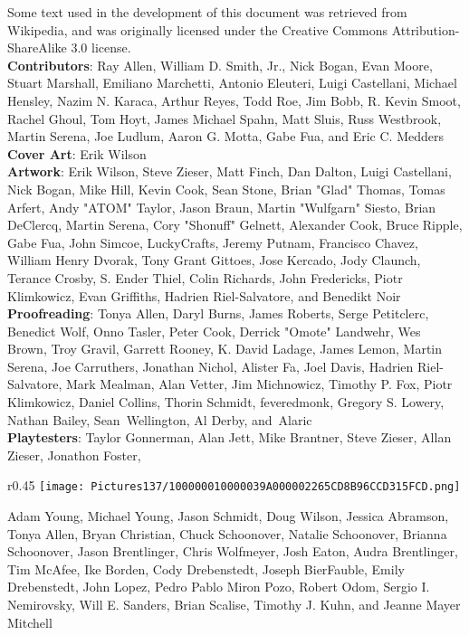 \documentclass[a4paper,twoside,openany,10pt]{book}
\begin{document}
Some text used in the development of this document was retrieved from Wikipedia, and was originally licensed under the Creative Commons Attribution-ShareAlike 3.0 license.\\

\textbf{Contributors}: Ray Allen, William D. Smith, Jr., Nick Bogan, Evan Moore, Stuart Marshall, Emiliano Marchetti, Antonio Eleuteri, Luigi Castellani, Michael Hensley, Nazim N. Karaca, Arthur Reyes, Todd Roe, Jim Bobb, R. Kevin Smoot, Rachel Ghoul, Tom Hoyt, James Michael Spahn, Matt Sluis, Russ Westbrook, Martin Serena, Joe Ludlum, Aaron G. Motta, Gabe Fua, and Eric C. Medders\\

\textbf{Cover Art}: Erik Wilson\\

\textbf{Artwork}: Erik Wilson, Steve Zieser, Matt Finch, Dan Dalton, Luigi Castellani, Nick Bogan, Mike Hill, Kevin Cook, Sean Stone, Brian "Glad" Thomas, Tomas Arfert, Andy "ATOM" Taylor, Jason Braun, Martin "Wulfgarn" Siesto, Brian DeClercq, Martin Serena, Cory "Shonuff" Gelnett, Alexander Cook, Bruce Ripple, Gabe Fua, John Simcoe, LuckyCrafts, Jeremy Putnam, Francisco Chavez, William Henry Dvorak, Tony Grant Gittoes, Jose Kercado, Jody Claunch, Terance Crosby, S. Ender Thiel, Colin Richards, John Fredericks, Piotr Klimkowicz, Evan Griffiths, Hadrien Riel-Salvatore, and Benedikt Noir\\

\textbf{Proofreading}: Tonya Allen, Daryl Burns, James Roberts, Serge Petitclerc, Benedict Wolf, Onno Tasler, Peter Cook, Derrick "Omote" Landwehr, Wes Brown, Troy Gravil, Garrett Rooney, K. David Ladage, James Lemon, Martin Serena, Joe Carruthers, Jonathan Nichol, Alister Fa, Joel Davis, Hadrien Riel-Salvatore, Mark Mealman, Alan Vetter, Jim Michnowicz, Timothy P. Fox, Piotr Klimkowicz, Daniel Collins, Thorin Schmidt, feveredmonk, Gregory S. Lowery, Nathan Bailey, Sean Wellington, Al Derby, and Alaric\\

\textbf{Playtesters}: Taylor Gonnerman, Alan Jett, Mike Brantner, Steve Zieser, Allan Zieser, Jonathon Foster, 
\begin{wrapfigure}{r}{0.45\textwidth}
	\texttt{[image: Pictures137/100000010000039A000002265CD8B96CCD315FCD.png]}
\end{wrapfigure}
Adam Young, Michael Young, Jason Schmidt, Doug Wilson, Jessica Abramson, Tonya Allen, Bryan Christian, Chuck Schoonover, Natalie Schoonover, Brianna Schoonover, Jason Brentlinger, Chris Wolfmeyer, Josh Eaton, Audra Brentlinger, Tim McAfee, Ike Borden, Cody Drebenstedt, Joseph BierFauble, Emily Drebenstedt, John Lopez, Pedro Pablo Miron Pozo, Robert Odom, Sergio I. Nemirovsky, Will E. Sanders, Brian Scalise, Timothy J. Kuhn, and Jeanne Mayer Mitchell\\
\end{document}
